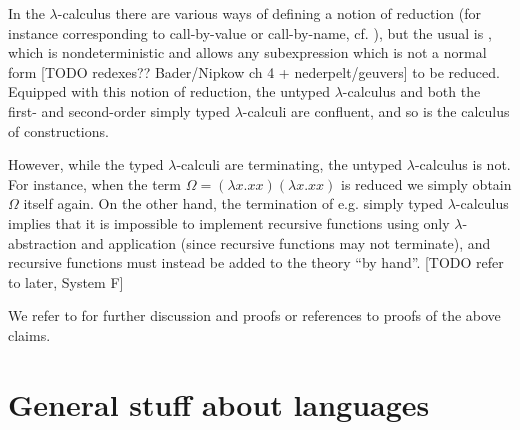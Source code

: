 \documentclass[a4paper, 11pt, article, danish, oneside]{memoir}
\begin{document}
\begin{examplebreak}
    In the $\lambda$-calculus there are various ways of defining a notion of reduction (for instance corresponding to call-by-value or call-by-name, cf. \cite[§5.1]{pierce-types}), but the usual is , which is nondeterministic and allows any subexpression which is not a normal form [TODO redexes?? Bader/Nipkow ch 4 + nederpelt/geuvers] to be reduced. Equipped with this notion of reduction, the untyped $\lambda$-calculus and both the first- and second-order simply typed $\lambda$-calculi are confluent, and so is the calculus of constructions.
    
    However, while the typed $\lambda$-calculi are terminating, the untyped $\lambda$-calculus is not. For instance, when the term $\Omega = (\lambda x.xx)(\lambda x.xx)$ is reduced we simply obtain $\Omega$ itself again. On the other hand, the termination of e.g. simply typed $\lambda$-calculus implies that it is impossible to implement recursive functions using only $\lambda$-abstraction and application (since recursive functions may not terminate), and recursive functions must instead be added to the theory \enquote{by hand}. [TODO refer to later, System F]
    
    We refer to \textcite{nederpelt-geuvers-types} for further discussion and proofs or references to proofs of the above claims.
\end{examplebreak}



\newcommand{\hastype}[5]{%
    \ifstrempty{#1}%
        {%
            \ifstrempty{#2}%
            {%
                #3 \vdash #4 : #5%
            }{%
                #2 \mid #3 \vdash #4 : #5%
            }%
        }{%
            \ifstrempty{#2}%
            {%
                #1 \mid \emptyset \mid #3 \vdash #4 : #5%
            }{%
                #1 \mid #2 \mid #3 \vdash #4 : #5%
            }%
        }%
}

\newcommand{\stotype}[4]{%
    \ifstrempty{#1}%
        {%
            \ifstrempty{#2}%
            {%
                #3 \vdash #4%
            }{%
                #2 \mid #3 \vdash #4%
            }%
        }{%
            \ifstrempty{#2}%
            {%
                #1 \mid \emptyset \mid #3 \vdash #4%
            }{%
                #1 \mid #2 \mid #3 \vdash #4%
            }%
        }%
}



\chapter{General stuff about languages}
\end{document}
